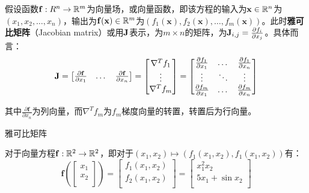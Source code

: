 \documentclass[11pt]{article}
\begin{document}
\begin{appendices}
假设函数$\mathbf{f}:R^n \rightarrow \mathbb{R}^m$为向量场，或向量函数，即该方程的输入为$\mathbf{x} \in \mathbb{R}^n$为$(x_1,x_2,\dots,x_n)$，输出为$\mathbf{f}(\mathbf{x}) \in \mathbb{R}^m$为$(f_1(\mathbf{x}),f_2(\mathbf{x}),\dots,f_m(\mathbf{x}))$。此时\textbf{雅可比矩阵}（Jacobian matrix）或用$\mathbf{J}$表示，为$m \times n$的矩阵，为$\mathbf{J}_{i,j} = \frac{\partial f_i}{\partial x_j}$。具体而言：
\begin{equation*}
    \mathbf{J} =
    \begin{bmatrix}
        \frac{\partial \mathbf{f}}{\partial x_1} & \dots & \frac{\partial \mathbf{f}}{\partial x_n} \\
    \end{bmatrix}
    = \begin{bmatrix}
        \nabla^{T} f_1 \\
        \vdots \\
        \nabla^{T} f_m \\
    \end{bmatrix}
    = \begin{bmatrix}
        \frac{\partial f_1}{\partial x_1} & \dots & \frac{\partial f_1}{\partial x_n} \\
        \vdots & \ddots & \vdots \\
        \frac{\partial f_m}{\partial x_1} & \dots & \frac{\partial f_m}{\partial x_n} \\
    \end{bmatrix}
\end{equation*}

其中$\frac{\partial \mathbf{f}}{\partial x_n}$为列向量，而$\nabla^T f_m$为$f_m$梯度向量的转置，转置后为行向量。

\begin{example}
    雅可比矩阵

    对于向量方程$\mathbf{f}:\mathbb{R}^2 \rightarrow \mathbb{R}^2$，即对于$(x_1,x_2) \mapsto (f_1(x_1,x_2),f_1(x_1,x_2))$有：
    \begin{equation*}
        \mathbf{f}\left(
            \begin{bmatrix}
                x_1 \\
                x_2 \\
            \end{bmatrix}
        \right)
        = \begin{bmatrix}
            f_1(x_1,x_2) \\
            f_2(x_1,x_2) \\
        \end{bmatrix}
        = \begin{bmatrix}
            x_1^2 x_2 \\
            5x_1 + \sin x_2 \\
        \end{bmatrix}
    \end{equation*}


\end{example}
\end{appendices}
\end{document}
